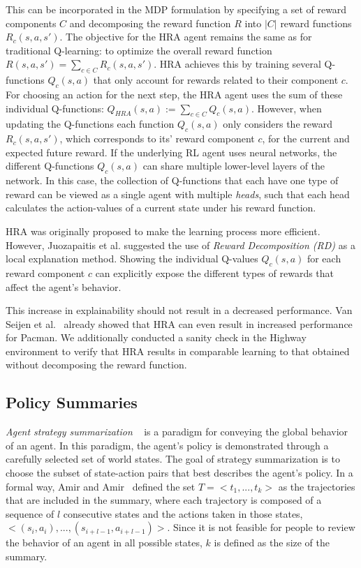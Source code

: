 \documentclass[runningheads]{llncs}
\newcommand{\shortcite}[1]{\cite{#1}}
\begin{document}
This can be incorporated in the MDP formulation by specifying a set of reward components $C$ and decomposing the reward function $R$ into $|C|$ reward functions $R_c(s,a,s')$. 
The objective for the HRA agent remains the same as for traditional Q-learning: to optimize the overall reward function $R(s,a,s') = \sum_{c \in C}R_c(s,a,s')$. 
HRA achieves this by training several Q-functions $Q_{c}(s,a)$ that only account for rewards related to their component $c$.
For choosing an action for the next step, the HRA agent uses the sum of these individual Q-functions: $Q_{HRA}(s,a):= \sum_{c \in C} Q_c(s,a)$.
However, when updating the Q-functions each function $Q_{c}(s,a)$ only considers the reward $R_c(s,a,s')$, which corresponds to its' reward component $c$, for the current and expected future reward.
If the underlying RL agent uses neural networks, the different Q-functions $Q_{c}(s,a)$ can share multiple lower-level layers of the network.
In this case, the collection of Q-functions that each have one type of reward can be viewed as a single agent with multiple \emph{heads}, such that each head calculates the action-values of a current state under his reward function.

HRA was originally proposed to make the learning process more efficient.
However, Juozapaitis et al. \shortcite{juozapaitis2019explainable} suggested the use of \emph{Reward Decomposition (RD)} as a local explanation method.
Showing the individual Q-values $Q_{c}(s,a)$ for each reward component $c$ can explicitly expose the different types of rewards that affect the agent's behavior.

This increase in explainability should not result in a decreased performance.
Van Seijen et al.~\shortcite{van2017hybrid} already showed that HRA can even result in increased performance for Pacman.
We additionally conducted a sanity check in the Highway environment to verify that HRA results in comparable learning to that obtained without decomposing the reward function.


\subsection{Policy Summaries}
\emph{Agent strategy summarization} ~\cite{amir2019summarizing} is a paradigm for conveying the global behavior of an agent. In this paradigm, the agent's policy is demonstrated through a carefully selected set of world states. The goal of strategy summarization is to choose the subset of state-action pairs that best describes the agent's policy. In a formal way, Amir and Amir~\cite{amir2018highlights} defined the set $T= <t_1,...,t_k>$ as the trajectories that are included in the summary, where each trajectory is composed of a sequence of $l$ consecutive states and the actions taken in those states, $<(s_i,a_i),...,(s_{i+l-1},a_{i+l-1})>$. Since it is not feasible for people to review the behavior of an agent in all possible states, $k$ is defined as the size of the summary. 
\end{document}
